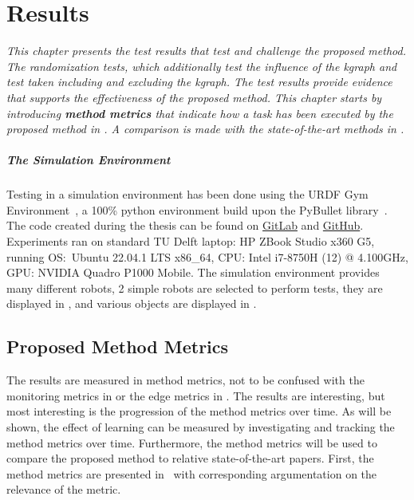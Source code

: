 \chapter{Results}%
\label{chap:results}
\textit{This chapter presents the test results that test and challenge the proposed method.  The randomization tests, which additionally test the influence of the \ac{kgraph} and test taken including and excluding the \ac{kgraph}. The test results provide evidence that supports the effectiveness of the proposed method. This chapter starts by introducing \textbf{method metrics} that indicate how a task has been executed by the proposed method in . A comparison is made with the state-of-the-art methods in . \bs}

\paragraph{The Simulation Environment}
Testing in a simulation environment has been done using the URDF Gym Environment~\cite{spahn_urdfenvironment_2022}, a 100\% python environment build upon the PyBullet library~\cite{coumans_pybullet_2016}. The code created during the thesis can be found on \href{https://gitlab.tudelft.nl/airlab-delft/msc_projects/msc_gijs_groote}{GitLab} and \href{https://github.com/GijsGroote/semantic-thinking-robot}{GitHub}. Experiments ran on standard TU Delft laptop: HP ZBook Studio x360 G5, running OS:~Ubuntu 22.04.1 LTS x86\_64, CPU: Intel i7-8750H (12) @ 4.100GHz, GPU: NVIDIA Quadro P1000 Mobile.\bs
The simulation environment provides many different robots, 2 simple robots are selected to perform tests, they are displayed in , and various objects are displayed in .

\section{Proposed Method Metrics}%
\label{sec:proposed_method_metrics}
The results are measured in method metrics, not to be confused with the monitoring metrics in  or the edge metrics in . The results are interesting, but most interesting is the progression of the method metrics over time. As will be shown, the effect of learning can be measured by investigating and tracking the method metrics over time. Furthermore, the method metrics will be used to compare the proposed method to relative state-of-the-art papers. First, the method metrics are presented in~ with corresponding argumentation on the relevance of the metric.\bs

